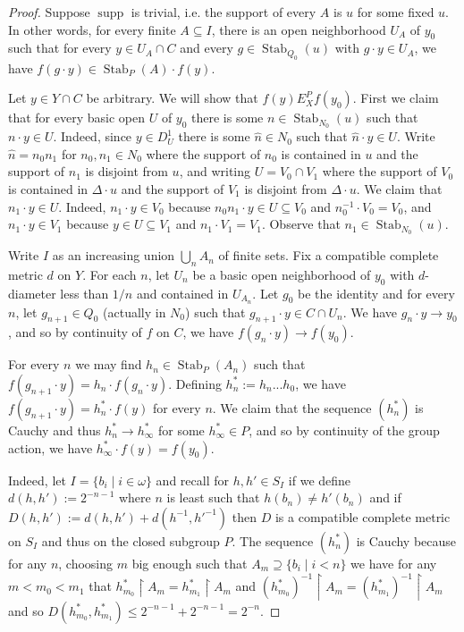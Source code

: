 \documentclass[12pt]{amsart}
\theoremstyle{plain}
\theoremstyle{definition}
\DeclareMathOperator{\supp}{supp}
\DeclareMathOperator{\Stab}{Stab}
\begin{document}
\begin{proof}
Suppose $\supp$ is trivial, i.e. the support of every $A$ is $u$ for some fixed $u$.
In other words, for every finite $A \subseteq I$, there is an open neighborhood $U_A$ of $y_0$ such that for every $y \in U_A \cap C$ and every $g \in \Stab_{Q_0}(u)$ with $g \cdot y \in U_A$, we have $f(g \cdot y) \in \Stab_P(A) \cdot f(y)$.

Let $y \in Y \cap C$ be arbitrary.
We will show that $f(y) \mathrel{E^P_X} f(y_0)$.
First we claim that for every basic open $U$ of $y_0$ there is some $n \in \Stab_{N_0}(u)$ such that $n \cdot y \in U$.
Indeed, since $y \in D^1_{U}$ there is some $\hat{n} \in N_0$ such that $\hat{n} \cdot y \in U$.
Write $\hat{n} = n_0n_1$ for $n_0, n_1 \in N_0$ where the support of $n_0$ is contained in $u$ and the support of $n_1$ is disjoint from $u$, and writing $U = V_0 \cap V_1$ where the support of $V_0$ is contained in $\Delta \cdot u$ and the support of $V_1$ is disjoint from $\Delta \cdot u$.
We claim that $n_1 \cdot y \in U$.
Indeed, $n_1 \cdot y \in V_0$ because $n_0n_1 \cdot y \in U \subseteq V_0$ and $n_0^{-1} \cdot V_0 = V_0$, and $n_1 \cdot y \in V_1$ because $y \in U \subseteq V_1$ and $n_1 \cdot V_1 = V_1$.
Observe that $n_1 \in \Stab_{N_0}(u)$.

Write $I$ as an increasing union $\bigcup_n A_n$ of finite sets.
Fix a compatible complete metric $d$ on $Y$.
For each $n$, let $U_n$ be a basic open neighborhood of $y_0$ with $d$-diameter less than $1/n$ and contained in $U_{A_n}$.
Let $g_0$ be the identity and for every $n$, let $g_{n+1} \in Q_0$ (actually in $N_0$) such that $g_{n+1} \cdot y \in C \cap U_{n}$.
We have $g_n \cdot y \rightarrow y_0$, and so by continuity of $f$ on $C$, we have $f(g_n \cdot y) \rightarrow f(y_0)$.

For every $n$ we may find $h_n \in \Stab_P(A_n)$ such that $f(g_{n+1}\cdot y) = h_n \cdot f(g_n \cdot y)$.
Defining $h^*_n := h_n ... h_0$, we have $f(g_{n+1} \cdot y) = h^*_n \cdot f(y)$ for every $n$.
We claim that the sequence $(h^*_n)$ is Cauchy and thus $h^*_n \rightarrow h^*_\infty$ for some $h^*_\infty \in P$, and so by continuity of the group action, we have $h^*_\infty \cdot f(y) = f(y_0)$.

Indeed, let $I = \{b_i \mid i \in \omega\}$ and recall for $h, h' \in S_I$ if we define $d(h, h') := 2^{-n-1}$ where $n$ is least such that $h(b_n) \neq h'(b_n)$ and if $D(h, h') := d(h, h') + d(h^{-1}, h'^{-1})$ then $D$ is a compatible complete metric on $S_I$ and thus on the closed subgroup $P$.
The sequence $(h^*_n)$ is Cauchy because for any $n$, choosing $m$ big enough such that $A_m \supseteq \{b_i \mid i < n\}$ we have for any $m < m_0 < m_1$ that $h^*_{m_0} \upharpoonright A_m = h^*_{m_1} \upharpoonright A_m$ and $(h^*_{m_0})^{-1} \upharpoonright A_m = (h^*_{m_1})^{-1} \upharpoonright A_m$ and so $D(h^*_{m_0}, h^*_{m_1}) \le 2^{-n-1} + 2^{-n-1} = 2^{-n}$.
\end{proof}
\end{document}
